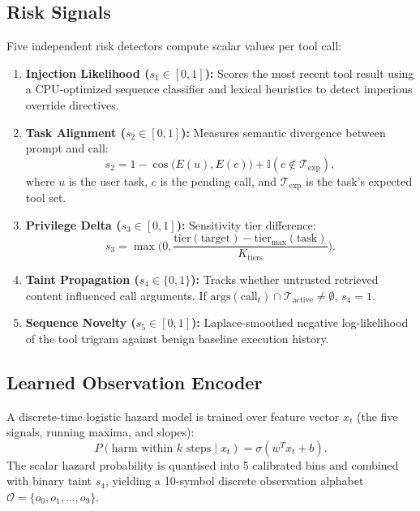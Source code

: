 \documentclass[conference]{IEEEtran}
\begin{document}
\subsection{Risk Signals}
Five independent risk detectors compute scalar values per tool call:
\begin{enumerate}
    \item \textbf{Injection Likelihood ($s_1 \in [0, 1]$):} Scores the most recent tool result using a CPU-optimized sequence classifier and lexical heuristics to detect imperious override directives.
    \item \textbf{Task Alignment ($s_2 \in [0, 1]$):} Measures semantic divergence between prompt and call:
    \begin{equation}
    s_2 = 1 - \cos\big(E(u), E(c)\big) + \mathbb{I}(c \notin \mathcal{T}_{\text{exp}}),
    \end{equation}
    where $u$ is the user task, $c$ is the pending call, and $\mathcal{T}_{\text{exp}}$ is the task's expected tool set.
    \item \textbf{Privilege Delta ($s_3 \in [0, 1]$):} Sensitivity tier difference:
    \begin{equation}
    s_3 = \max\Big(0, \frac{\text{tier}(\text{target}) - \text{tier}_{\max}(\text{task})}{K_{\text{tiers}}}\Big).
    \end{equation}
    \item \textbf{Taint Propagation ($s_4 \in \{0, 1\}$):} Tracks whether untrusted retrieved content influenced call arguments. If $\text{args}(\text{call}_t) \cap \mathcal{T}_{\text{active}} \neq \emptyset$, $s_4 = 1$.
    \item \textbf{Sequence Novelty ($s_5 \in [0, 1]$):} Laplace-smoothed negative log-likelihood of the tool trigram against benign baseline execution history.
\end{enumerate}

\subsection{Learned Observation Encoder}
A discrete-time logistic hazard model is trained over feature vector $x_t$ (the five signals, running maxima, and slopes):
\begin{equation}
P(\text{harm within } k \text{ steps} \mid x_t) = \sigma(w^T x_t + b).
\end{equation}
The scalar hazard probability is quantised into 5 calibrated bins and combined with binary taint $s_4$, yielding a 10-symbol discrete observation alphabet $\mathcal{O} = \{o_0, o_1, \dots, o_9\}$.
\end{document}
